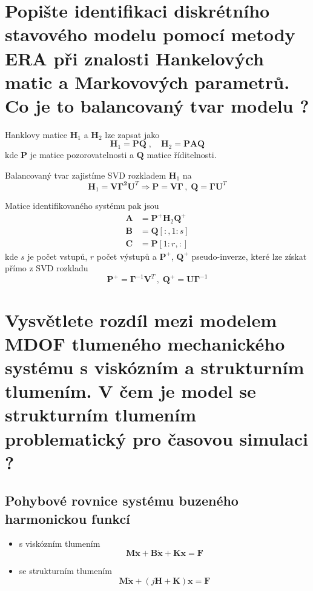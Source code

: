 \documentclass{article}
\begin{document}
	\section{Popište identifikaci diskrétního stavového modelu pomocí metody ERA při znalosti Hankelových matic a Markovových parametrů. Co je to balancovaný tvar modelu ? }

	Hanklovy matice $\bm{H}_1$ a $\bm{H}_2$ lze zapsat jako
	\begin{equation}
		\bm{H}_1 = \bm{P}\bm{Q}
		\;,\quad 
		\bm{H}_2 = \bm{P}\bm{A}\bm{Q}
	\end{equation}
	kde $\bm{P}$ je matice pozorovatelnosti a $\bm{Q}$ matice říditelnosti.

	Balancovaný tvar zajistíme SVD rozkladem $\bm{H}_1$ na
	\begin{equation}
		\bm{H}_1 = \bm{V}\bm{\Gamma^2}\bm{U}^T
		\Rightarrow
		\bm{P} = \bm{V}\bm{\Gamma} \,,\; \bm{Q} = \bm{\Gamma}\bm{U}^T
	\end{equation}

	Matice identifikovaného systému pak jsou
	\begin{align}
		\bm{A} &= \bm{P}^+ \bm{H}_2 \bm{Q}^+ \\
		\bm{B} &= \bm{Q}[:,1:s] \\
		\bm{C} &= \bm{P}[1:r,:]
	\end{align}
	kde $s$ je počet vstupů, $r$ počet výstupů a $\bm{P}^+$, $\bm{Q}^+$ pseudo-inverze, které lze získat přímo z SVD rozkladu
	\begin{equation}
		\bm{P}^+ = \bm{\Gamma}^{-1}\bm{V}^T
		\,,\;
		\bm{Q}^+ = \bm{U}\bm{\Gamma}^{-1}
	\end{equation}

	\section{Vysvětlete rozdíl mezi modelem MDOF tlumeného mechanického systému s viskózním a strukturním tlumením. V čem je model se strukturním tlumením problematický pro časovou simulaci ? }

	\subsection*{Pohybové rovnice systému buzeného harmonickou funkcí}
	\begin{itemize}
		\item s viskózním tlumením
		\begin{equation}
			\bm{M}\bm{\ddot{x}} + \bm{B}\bm{\dot{x}} + \bm{K}\bm{x} = \bm{F}
		\end{equation}
		\item se strukturním tlumením
		\begin{equation}
			\bm{M}\bm{\ddot{x}} + (j\bm{H} + \bm{K}) \bm{x} = \bm{F}
		\end{equation}
	\end{itemize}
\end{document}
